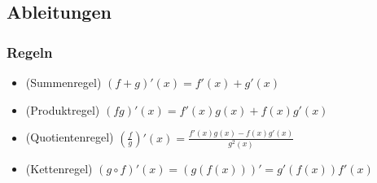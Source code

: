 \subsection{Ableitungen}
\subsubsection{Regeln}
\begin{itemize}[leftmargin=*]
	\item (Summenregel) $(f + g)'(x) = f'(x) + g'(x)$
	\item (Produktregel) $(fg)'(x) = f'(x)g(x) + f(x)g'(x)$
	\item (Quotientenregel) $(\frac{f}{g})'(x) = \frac{f'(x)g(x) -
	f(x)g'(x)}{g^2(x)}$
	\item (Kettenregel) $(g \circ f)'(x) = (g(f(x)))' = g'(f(x)) f'(x)$
\end{itemize}

